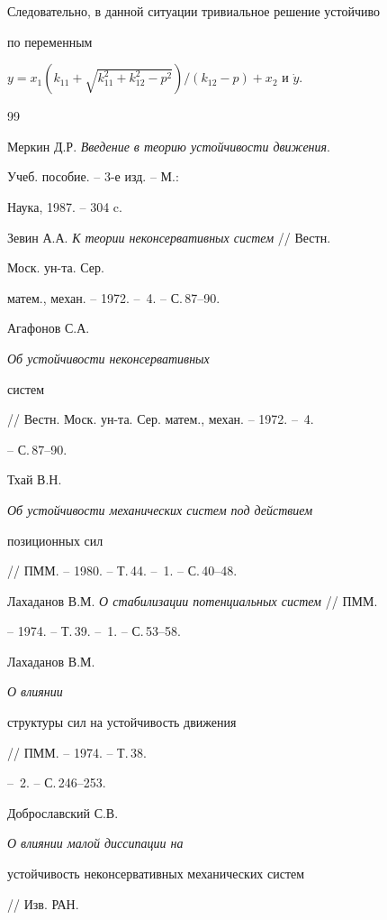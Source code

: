 Следовательно, в данной ситуации тривиальное решение устойчиво


по переменным


$y=x_{1}(k_{11}+\sqrt{k_{11}^{2}+k_{12}^{2}-p^{2}}) /(k_{12}-p)


+ x_{2}$ и $\Dot{y}$.





\begin{thebibliography}{99}







Меркин Д.Р. {\em Введение в теорию устойчивости движения}.


Учеб. пособие. -- 3-е изд. -- М.:


Наука, 1987. -- 304 c.




Зевин А.А. {\em К теории неконсервативных систем} // Вестн.


Моск. ун-та. Сер.


матем., механ. -- 1972. -- \No\,4. -- С.\,87--90.




Агафонов С.А. {\em Об устойчивости неконсервативных


систем} // Вестн. Моск. ун-та. Сер. матем., механ. -- 1972. -- \No\,4.


-- С.\,87--90.




Тхай В.Н. {\em Об устойчивости механических систем под действием


позиционных сил} // ПММ. -- 1980. -- Т.\,44. -- \No\,1. -- С.\,40--48.




Лахаданов В.М. {\em О стабилизации потенциальных систем} // ПММ.


-- 1974. -- Т.\,39. -- \No\,1. -- С.\,53--58.




Лахаданов В.М. {\em О влиянии


структуры сил на устойчивость движения} // ПММ. -- 1974. -- Т.\,38.


-- \No\,2. -- С.\,246--253.




Доброславский С.В. {\em О влиянии малой диссипации на


устойчивость неконсервативных механических систем} // Изв. РАН.



\end{thebibliography}
